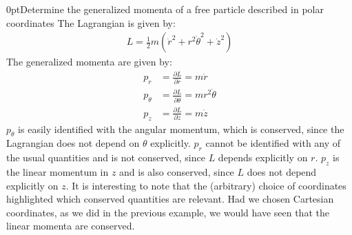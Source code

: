 \begin{example}{0pt}{Determine the generalized momenta of a free particle described in polar coordinates}{}
The Lagrangian is given by:
\begin{align*}
L=\frac{1}{2}m(\dot{r}^2+r^2\dot{\theta}^2+\dot{z}^2)
\end{align*}
The generalized momenta are given by:
\begin{align*}
p_r&=\frac{\partial L}{\partial \dot{r}}=m\dot{r}\\
p_\theta&=\frac{\partial L}{\partial \dot{\theta}}=mr^2\dot{\theta}\\
p_z&=\frac{\partial L}{\partial \dot{z}}=m\dot{z}
\end{align*}
$p_\theta$ is easily identified with the angular momentum, which is conserved, since the Lagrangian does not depend on $\theta$ explicitly. $p_r$ cannot be identified with any of the usual quantities and is not conserved, since $L$ depends explicitly on $r$. $p_z$ is the linear momentum in $z$ and is also conserved, since $L$ does not depend explicitly on $z$. It is interesting to note that the (arbitrary) choice of coordinates highlighted which conserved quantities are relevant. Had we chosen Cartesian coordinates, as we did in the previous example, we would have seen that the linear momenta are conserved.
\label{ex:polarmomentum}
\end{example}

